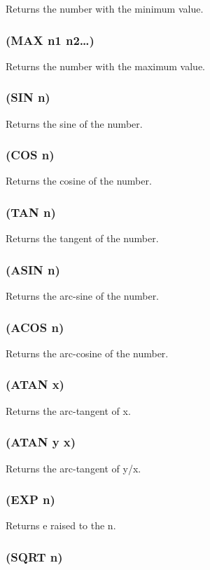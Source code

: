 \documentclass[11pt]{article}
\begin{document}
Returns the number with the minimum value.
\subsubsection{(MAX n1 n2\ldots{})}
\label{sec-4-25-30}

Returns the number with the maximum value.
\subsubsection{(SIN n)}
\label{sec-4-25-31}

Returns the sine of the number.
\subsubsection{(COS n)}
\label{sec-4-25-32}

Returns the cosine of the number.
\subsubsection{(TAN n)}
\label{sec-4-25-33}

Returns the tangent of the number.
\subsubsection{(ASIN n)}
\label{sec-4-25-34}

Returns the arc-sine of the number.
\subsubsection{(ACOS n)}
\label{sec-4-25-35}

Returns the arc-cosine of the number.
\subsubsection{(ATAN x)}
\label{sec-4-25-36}

Returns the arc-tangent of x.
\subsubsection{(ATAN y x)}
\label{sec-4-25-37}

Returns the arc-tangent of y/x.
\subsubsection{(EXP n)}
\label{sec-4-25-38}

Returns e raised to the n.
\subsubsection{(SQRT n)}
\label{sec-4-25-39}
\end{document}
